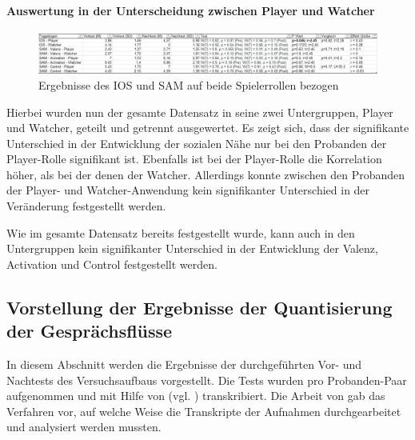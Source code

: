 \paragraph{Auswertung in der Unterscheidung zwischen Player und Watcher}

\begin{figure}[ht]
\centering
\includegraphics[width=1\linewidth]{content/pictures/IOS_SAM_Player_Watcher.png}
\caption{Ergebnisse des \ac{IOS} und \ac{SAM} auf beide Spielerrollen bezogen}
\label{fig:ios_sam_roles}
\end{figure}

Hierbei wurden nun der gesamte Datensatz in seine zwei Untergruppen, Player und Watcher, geteilt und getrennt ausgewertet. Es zeigt sich, dass der signifikante Unterschied in der Entwicklung der sozialen Nähe nur bei den Probanden der Player-Rolle signifikant ist. Ebenfalls ist bei der Player-Rolle die Korrelation höher, als bei der denen der Watcher. Allerdings konnte zwischen den Probanden der Player- und Watcher-Anwendung kein signifikanter Unterschied in der Veränderung festgestellt werden.

Wie im gesamte Datensatz bereits festgestellt wurde, kann auch in den Untergruppen kein signifikanter Unterschied in der Entwicklung der Valenz, Activation und Control festgestellt werden.

\subsection{Vorstellung der Ergebnisse der Quantisierung der Gesprächsflüsse}
In diesem Abschnitt werden die Ergebnisse der durchgeführten Vor- und Nachtests des Versuchsaufbaus vorgestellt. Die Tests wurden pro Probanden-Paar aufgenommen und mit Hilfe von  (vgl. \cite{bain_whisperx_2023}) transkribiert. Die Arbeit von \cite{nasir_effect_2015} gab das Verfahren vor, auf welche Weise die Transkripte der Aufnahmen durchgearbeitet und analysiert werden mussten.

